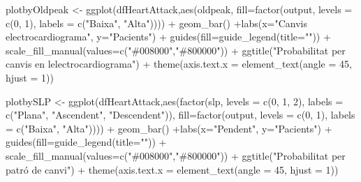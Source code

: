 \documentclass[
]{article}
\newenvironment{Shaded}{\begin{snugshade}}{\end{snugshade}}
\newcommand{\AttributeTok}[1]{\textcolor[rgb]{0.80,0.80,0.80}{#1}}
\newcommand{\DecValTok}[1]{\textcolor[rgb]{0.86,0.86,0.80}{#1}}
\newcommand{\FunctionTok}[1]{\textcolor[rgb]{0.94,0.94,0.56}{#1}}
\newcommand{\NormalTok}[1]{\textcolor[rgb]{0.80,0.80,0.80}{#1}}
\newcommand{\OtherTok}[1]{\textcolor[rgb]{0.94,0.94,0.56}{#1}}
\newcommand{\SpecialCharTok}[1]{\textcolor[rgb]{0.86,0.64,0.64}{#1}}
\newcommand{\StringTok}[1]{\textcolor[rgb]{0.80,0.58,0.58}{#1}}
\begin{document}
\begin{Shaded}
\begin{Highlighting}[]
\NormalTok{plotbyOldpeak }\OtherTok{\textless{}{-}} \FunctionTok{ggplot}\NormalTok{(dfHeartAttack,}\FunctionTok{aes}\NormalTok{(oldpeak, }\AttributeTok{fill=}\FunctionTok{factor}\NormalTok{(output, }\AttributeTok{levels =} \FunctionTok{c}\NormalTok{(}\DecValTok{0}\NormalTok{, }\DecValTok{1}\NormalTok{), }\AttributeTok{labels =} \FunctionTok{c}\NormalTok{(}\StringTok{"Baixa"}\NormalTok{, }\StringTok{"Alta"}\NormalTok{)))) }\SpecialCharTok{+} 
                    \FunctionTok{geom\_bar}\NormalTok{() }\SpecialCharTok{+}\FunctionTok{labs}\NormalTok{(}\AttributeTok{x=}\StringTok{"Canvis electrocardiograma"}\NormalTok{, }\AttributeTok{y=}\StringTok{"Pacients"}\NormalTok{) }\SpecialCharTok{+} 
                    \FunctionTok{guides}\NormalTok{(}\AttributeTok{fill=}\FunctionTok{guide\_legend}\NormalTok{(}\AttributeTok{title=}\StringTok{""}\NormalTok{)) }\SpecialCharTok{+} 
                  \FunctionTok{scale\_fill\_manual}\NormalTok{(}\AttributeTok{values=}\FunctionTok{c}\NormalTok{(}\StringTok{"\#008000"}\NormalTok{,}\StringTok{"\#800000"}\NormalTok{)) }\SpecialCharTok{+} 
                    \FunctionTok{ggtitle}\NormalTok{(}\StringTok{"Probabilitat per canvis en l\textquotesingle{}electrocardiograma"}\NormalTok{) }\SpecialCharTok{+}
          \FunctionTok{theme}\NormalTok{(}\AttributeTok{axis.text.x =} \FunctionTok{element\_text}\NormalTok{(}\AttributeTok{angle =} \DecValTok{45}\NormalTok{, }\AttributeTok{hjust =} \DecValTok{1}\NormalTok{))}

\NormalTok{plotbySLP }\OtherTok{\textless{}{-}} \FunctionTok{ggplot}\NormalTok{(dfHeartAttack,}\FunctionTok{aes}\NormalTok{(}\FunctionTok{factor}\NormalTok{(slp, }\AttributeTok{levels =} \FunctionTok{c}\NormalTok{(}\DecValTok{0}\NormalTok{, }\DecValTok{1}\NormalTok{, }\DecValTok{2}\NormalTok{), }\AttributeTok{labels =} \FunctionTok{c}\NormalTok{(}\StringTok{"Plana"}\NormalTok{, }\StringTok{"Ascendent"}\NormalTok{, }\StringTok{"Descendent"}\NormalTok{)), }\AttributeTok{fill=}\FunctionTok{factor}\NormalTok{(output, }\AttributeTok{levels =} \FunctionTok{c}\NormalTok{(}\DecValTok{0}\NormalTok{, }\DecValTok{1}\NormalTok{), }\AttributeTok{labels =} \FunctionTok{c}\NormalTok{(}\StringTok{"Baixa"}\NormalTok{, }\StringTok{"Alta"}\NormalTok{)))) }\SpecialCharTok{+} 
                    \FunctionTok{geom\_bar}\NormalTok{() }\SpecialCharTok{+}\FunctionTok{labs}\NormalTok{(}\AttributeTok{x=}\StringTok{"Pendent"}\NormalTok{, }\AttributeTok{y=}\StringTok{"Pacients"}\NormalTok{) }\SpecialCharTok{+} 
                    \FunctionTok{guides}\NormalTok{(}\AttributeTok{fill=}\FunctionTok{guide\_legend}\NormalTok{(}\AttributeTok{title=}\StringTok{""}\NormalTok{)) }\SpecialCharTok{+} 
                  \FunctionTok{scale\_fill\_manual}\NormalTok{(}\AttributeTok{values=}\FunctionTok{c}\NormalTok{(}\StringTok{"\#008000"}\NormalTok{,}\StringTok{"\#800000"}\NormalTok{)) }\SpecialCharTok{+} 
                    \FunctionTok{ggtitle}\NormalTok{(}\StringTok{"Probabilitat per patró de canvi"}\NormalTok{) }\SpecialCharTok{+}
          \FunctionTok{theme}\NormalTok{(}\AttributeTok{axis.text.x =} \FunctionTok{element\_text}\NormalTok{(}\AttributeTok{angle =} \DecValTok{45}\NormalTok{, }\AttributeTok{hjust =} \DecValTok{1}\NormalTok{))}


\end{Highlighting}
\end{Shaded}
\end{document}
